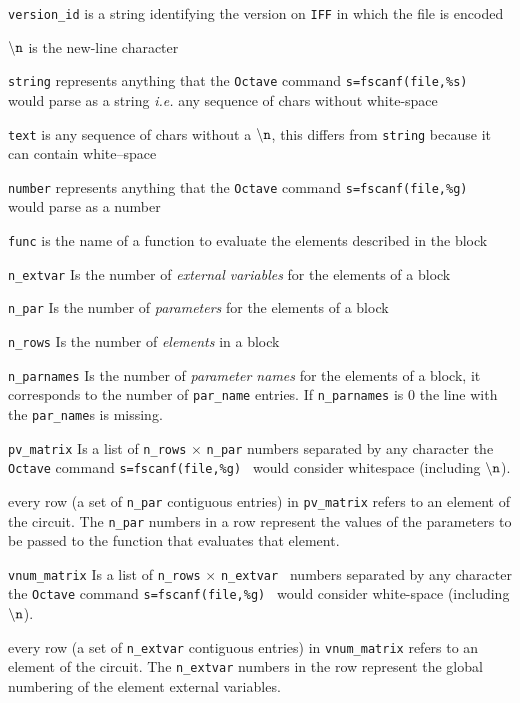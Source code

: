 \documentclass{scrartcl}
\newcommand{\Iff}{{\tt IFF}}
\newcommand{\nl}{{\tt \backslash n}}
\newcommand{\oct}{{\tt Octave}}
\begin{document}
\begin{description}
\item  {\tt version\_id} is a string identifying the version on {\Iff} 
  in which the file is encoded
\item  $\nl$ is the new-line character
\item {\tt string} represents anything that the {\oct} command 
  {\tt s=fscanf(file,\%s) } would parse as a string {\it i.e.} any sequence of 
  chars without white-space
\item {\tt text} is any sequence of chars without a $\nl$, 
  this differs from {\tt string} because it can contain white--space
\item {\tt number} represents anything that the {\oct} command 
  {\tt s=fscanf(file,\%g) } would parse as a number
\item {\tt func} is the name of a function to evaluate the elements 
  described in the block
\item {\tt n\_extvar} Is the number of {\it external variables} 
  for the elements of a block
\item {\tt n\_par} Is the number of {\it parameters} for the elements 
  of a block
\item {\tt n\_rows} Is the number of {\it elements} in a block
\item {\tt n\_parnames} Is the number of {\it parameter names} for the 
  elements of a block, it corresponds to the number of {\tt par\_name} entries.
  If {\tt n\_parnames} is 0 the line with the {\tt par\_name}s is missing.
\item {\tt pv\_matrix} Is a list of {\tt n\_rows} $\times$ 
  {\tt n\_par} numbers separated by any character the 
  {\oct} command {\tt s=fscanf(file,\%g) } would consider whitespace 
  (including $\nl$).
\item [] every row (a set of {\tt n\_par} contiguous entries) 
  in {\tt pv\_matrix} refers to an element of the circuit. 
  The {\tt n\_par} numbers in a row represent the values of the 
  parameters to be passed to the function that evaluates that element.
\item {\tt vnum\_matrix} Is a list of {\tt n\_rows} $\times$ {\tt n\_extvar }
  numbers separated by any character the {\oct} command {\tt s=fscanf(file,\%g) } 
  would consider white-space (including $\nl$).
\item [] every row (a set of {\tt n\_extvar} contiguous entries) 
  in {\tt vnum\_matrix} refers to an element of the circuit. 
  The {\tt n\_extvar} numbers in the row represent the global numbering of the element 
  external variables.
\end{description}
\end{document}
